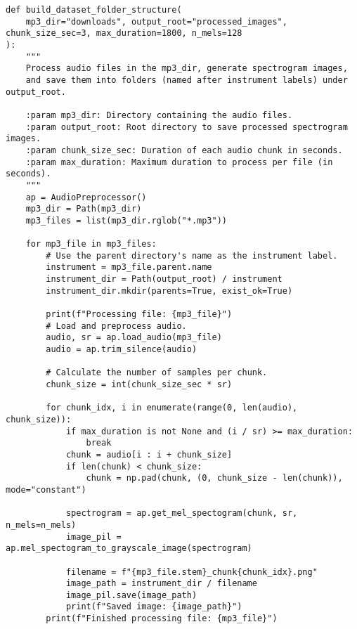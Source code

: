 \begin{lstlisting}[caption=Full audio-to-spectrogram processing pipeline]
def build_dataset_folder_structure(
    mp3_dir="downloads", output_root="processed_images", chunk_size_sec=3, max_duration=1800, n_mels=128
):
    """
    Process audio files in the mp3_dir, generate spectrogram images,
    and save them into folders (named after instrument labels) under output_root.

    :param mp3_dir: Directory containing the audio files.
    :param output_root: Root directory to save processed spectrogram images.
    :param chunk_size_sec: Duration of each audio chunk in seconds.
    :param max_duration: Maximum duration to process per file (in seconds).
    """
    ap = AudioPreprocessor()
    mp3_dir = Path(mp3_dir)
    mp3_files = list(mp3_dir.rglob("*.mp3"))

    for mp3_file in mp3_files:
        # Use the parent directory's name as the instrument label.
        instrument = mp3_file.parent.name
        instrument_dir = Path(output_root) / instrument
        instrument_dir.mkdir(parents=True, exist_ok=True)

        print(f"Processing file: {mp3_file}")
        # Load and preprocess audio.
        audio, sr = ap.load_audio(mp3_file)
        audio = ap.trim_silence(audio)

        # Calculate the number of samples per chunk.
        chunk_size = int(chunk_size_sec * sr)

        for chunk_idx, i in enumerate(range(0, len(audio), chunk_size)):
            if max_duration is not None and (i / sr) >= max_duration:
                break
            chunk = audio[i : i + chunk_size]
            if len(chunk) < chunk_size:
                chunk = np.pad(chunk, (0, chunk_size - len(chunk)), mode="constant")

            spectrogram = ap.get_mel_spectogram(chunk, sr, n_mels=n_mels)
            image_pil = ap.mel_spectogram_to_grayscale_image(spectrogram)

            filename = f"{mp3_file.stem}_chunk{chunk_idx}.png"
            image_path = instrument_dir / filename
            image_pil.save(image_path)
            print(f"Saved image: {image_path}")
        print(f"Finished processing file: {mp3_file}")

\end{lstlisting}


